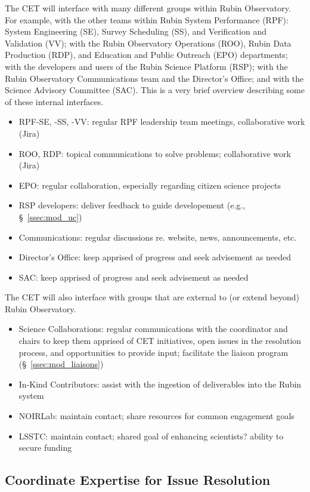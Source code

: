 \documentclass[DM,lsstdraft,toc]{lsstdoc}
\begin{document}
The CET will interface with many different groups within Rubin Observatory.
For example, with the other teams within Rubin System Performance (RPF): System Engineering (SE), Survey Scheduling (SS), and Verification and Validation (VV); with the Rubin Observatory Operations (ROO), Rubin Data Production (RDP), and Education and Public Outreach (EPO) departments; with the developers and users of the Rubin Science Platform (RSP); with the Rubin Observatory Communications team and the Director's Office; and with the Science Advisory Committee (SAC). 
This is a very brief overview describing some of these internal interfaces.
\begin{itemize}
\item RPF-SE, -SS, -VV: regular RPF leadership team meetings, collaborative work (Jira)
\item ROO, RDP: topical communications to solve problems; collaborative work (Jira)
\item EPO: regular collaboration, especially regarding citizen science projects
\item RSP developers: deliver feedback to guide developement (e.g., \S~\ref{ssec:mod_uc})
\item Communications: regular discussions re. website, news, announcements, etc.
\item Director's Office: keep apprised of progress and seek advisement as needed
\item SAC: keep apprised of progress and seek advisement as needed
\end{itemize}

The CET will also interface with groups that are external to (or extend beyond) Rubin Observatory.
\begin{itemize}
\item Science Collaborations: regular communications with the coordinator and chairs to keep them apprised of CET initiatives, open issues in the resolution process, and opportunities to provide input; facilitate the liaison program (\S~\ref{ssec:mod_liaisons})
\item In-Kind Contributors: assist with the ingestion of deliverables into the Rubin system
\item NOIRLab: maintain contact; share resources for common engagement goals
\item LSSTC: maintain contact; shared goal of enhancing scientists? ability to secure funding
\end{itemize}


\subsection{Coordinate Expertise for Issue Resolution}\label{ssec:mod_coord}
\end{document}
